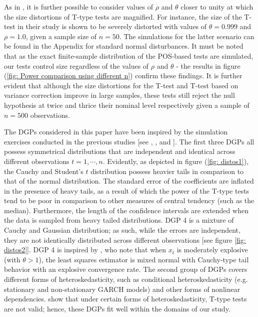 \documentclass[harvard,11pt]{article}
\begin{document}
As in \citet{mankiw1986we}, it is further possible to consider values of $\rho$ and $\theta$ closer to unity at which the size distortions of T-type tests are magnified. For instance, the size of the T-test in their study is shown to be severely distorted with values of $\theta=0.999$ and $\rho=1.0$, given a sample size of $n=50$. The simulations for the latter scenario can be found in the Appendix for standard normal disturbances. It must be noted that as the exact finite-sample distribution of the POS-based tests are simulated, our tests control size regardless of the values of $\rho$ and $\theta$ - the results in figure (\ref{fig: Power comparison using different n}) confirm these findings. It is further evident that although the size distortions for the T-test and T-test based on \citet{white1980heteroskedasticity} variance correction improve in large samples, these tests still reject the null hypothesis at twice and thrice their nominal level respectively given a sample of $n=500$ observations.

The DGPs considered in this paper have been inspired by the simulation exercises conducted in the previous studies [see \citet{mankiw1986we}, \citet{dufour1995exact}, \citet{coudin2009finite} and \citet{dufour2010exact}]. The first three DGPs all possess symmetrical distributions that are independent and identical across different observations $t=1,\cdots,n$. Evidently, as depicted in figure (\ref{fig: distos1}), the Cauchy and Student's $t$ distribution possess heavier tails in comparison to that of the normal distribution. The standard error of the coefficients are inflated in the presence of heavy tails, as a result of which the power of the T-type tests tend to be poor in comparison to other measures of central tendency (such as the median). Furthermore, the length of the confidence intervals are extended when the data is sampled from heavy tailed distributions. DGP 4 is a mixture of Cauchy and Gaussian distribution; as such, while the errors are independent, they are not identically distributed across different observations [see figure \ref{fig: distos2}]. DGP 4 is inspired by \citet{magdalinos2009limit}, who note that when $x_t$ is moderately explosive (with $\theta>1$), the least squares estimator is mixed normal with Cauchy-type tail behavior with an explosive convergence rate. The second group of DGPs covers different forms of heteroskedasticity, such as conditional heteroskedasticity (e.g. stationary and non-stationary GARCH models) and other forms of nonlinear dependencies. \citet{dufour2010exact} show that under certain forms of heteroskedasticity, T-type tests are not valid; hence, these DGPs fit well within the domains of our study.  
\end{document}
